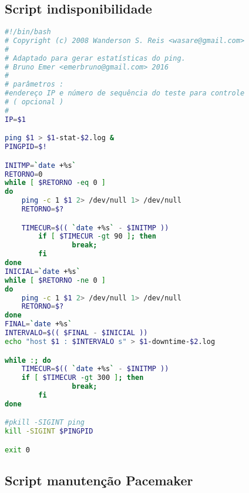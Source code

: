 
\chapter{}
\label{cap:apscripts}

\section{Script indisponibilidade}
\label{ap:scriptindisp}

\begin{lstlisting}[language=bash]
#!/bin/bash
# Copyright (c) 2008 Wanderson S. Reis <wasare@gmail.com>
#
# Adaptado para gerar estatísticas do ping.
# Bruno Emer <emerbruno@gmail.com> 2016
#
# parâmetros :
#endereço IP e número de sequência do teste para controle
# ( opcional )
#
IP=$1

ping $1 > $1-stat-$2.log &
PINGPID=$!

INITMP=`date +%s`
RETORNO=0
while [ $RETORNO -eq 0 ]
do
	ping -c 1 $1 2> /dev/null 1> /dev/null
	RETORNO=$?

	TIMECUR=$(( `date +%s` - $INITMP ))
        if [ $TIMECUR -gt 90 ]; then
                break;
        fi
done
INICIAL=`date +%s`
while [ $RETORNO -ne 0 ]
do
	ping -c 1 $1 2> /dev/null 1> /dev/null
	RETORNO=$?
done
FINAL=`date +%s`
INTERVALO=$(( $FINAL - $INICIAL ))
echo "host $1 : $INTERVALO s" > $1-downtime-$2.log

while :; do
	TIMECUR=$(( `date +%s` - $INITMP ))
	if [ $TIMECUR -gt 300 ]; then
                break;
        fi
done

#pkill -SIGINT ping
kill -SIGINT $PINGPID

exit 0
\end{lstlisting}


\section{Script manutenção Pacemaker}
\label{ap:scriptmanutencao}

